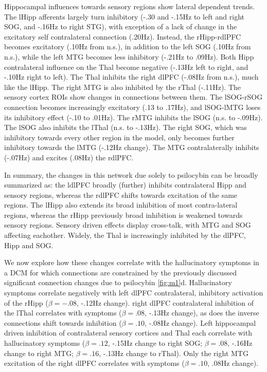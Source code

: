 \documentclass{article}
\begin{document}
Hippocampal influences towards sensory regions show lateral dependent trends. The lHipp afferents largely turn inhibitory (-.30 and -.15Hz to left and right SOG, and -.16Hz to right STG), with exception of a lack of change in the excitatory self contralateral connection (.20Hz). Instead, the rHipp-rdlPFC becomes excitatory (.10Hz from n.s.), in addition to the left SOG (.10Hz from n.s.), while the left MTG becomes less inhibitory (-.21Hz to .09Hz). Both Hipp contralateral influence on the Thal become negative (-.13Hz left to right, and -.10Hz right to left). The Thal inhibits the right dlPFC (-.08Hz from n.s.), much like the lHipp. The right MTG is also inhibited by the rThal (-.11Hz). The sensory cortex ROIs show changes in connections between them. The lSOG-rSOG connection becomes increasingly excitatory (.13 to .17Hz), and lSOG-lMTG loses its inhibitory effect (-.10 to .01Hz). The rMTG inhibits the lSOG (n.s. to -.09Hz). The lSOG also inhibits the lThal (n.s. to -.13Hz). The right SOG, which was inhibitory towards every other region in the model, only becomes further inhibitory towards the lMTG (-.12Hz change). The MTG contralaterally inhibits (-.07Hz) and excites (.08Hz) the rdlPFC. 

In summary, the changes in this network due solely to psilocybin can be broadly summarized as: the ldlPFC broadly (further) inhibits contralateral Hipp and sensory regions, whereas the rdlPFC shifts towards excitation of the same regions. The lHipp also extends its broad inhibition of most contra-lateral regions, whereas the rHipp previously broad inhibition is weakened towards sensory regions. Sensory driven effects display cross-talk, with MTG and SOG affecting eachother. Widely, the Thal is increasingly inhibited by the dlPFC, Hipp and SOG. 

We now explore how these changes correlate with the hallucinatory symptoms in a DCM for which connections are constrained by the previously discussed significant connection changes due to psilocybin \ref{fig:m1}d. Hallucinatory symptoms correlate negatively with left dlPFC contralateral, inhibitory activation of the rHipp ($\beta = -.08$, -.12Hz change). right dlPFC contralateral inhibition of the lThal correlates with symptoms ($\beta = .08$, -.13Hz change), as does the inverse connections shift towards inhibition ($\beta = .10$, -.08Hz change). Left hippocampal driven inhibition of contralateral sensory cortices and Thal each correlate with hallucinatory symptoms ($\beta = .12$, -.15Hz change to right SOG; $\beta = .08$, -.16Hz change to right MTG; $\beta = .16$, -.13Hz change to rThal). Only the right MTG excitation of the right dlPFC correlates with symptoms ($\beta = .10$, .08Hz change). 
\end{document}
